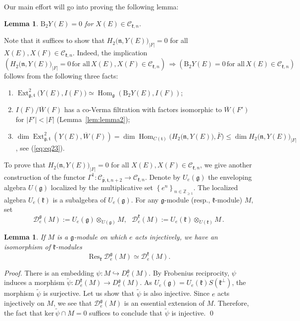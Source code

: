 \documentclass{tglat2e}
\newtheorem{lemma}[theorem]{Lemma}
\theoremstyle{definition}
\theoremstyle{remark}
\renewcommand{\tt}{\mathfrak{t}}
\newcommand{\kk}{\mathfrak{k}}
\newcommand{\nn}{\mathfrak{n}}
\newcommand{\pp}{\mathfrak{p}}
\renewcommand{\gg}{\mathfrak{g}}
\DeclareMathOperator{\Res}{Res}
\newcommand{\Ker}{\mathrm{ker}}
\DeclareMathOperator{\Hom}{Hom}
\DeclareMathOperator{\Ext}{Ext}
\begin{document}
Our main effort will go into proving the following lemma:
	
	\begin{lemma}
		$\mathrm{B}_2Y(E)=0$ for $X(E)\in\mathcal{C}_{\kk,n}$.
		\label{lem:lem18}
	\end{lemma}
	
	Note that it suffices to show that $H_2\big(\nn,Y(E)\big)_{|F|}=0$ for all $X(E),X(F)\in\mathcal{C}_{\kk,n}$.  Indeed, 
the implication 
$$\left(H_2\big(\nn,Y(E)\big)_{|F|}=0\,\text{for all} \,X(E),X(F)\in\mathcal{C}_{\kk,n}\right)\,\Rightarrow \left(\mathrm{B}_2Y(E)=0\,\text{for all}\, X(E)\in\mathcal{C}_{\kk,n}\right)$$ follows from the following three facts:
	\begin{enumerate}
		\item $\Ext^2_{\gg,\tt}\big(Y(E),I(F)\big)\simeq \Hom_\gg\left(\mathrm{B}_2Y(E),I(F)\right)$;
		\item $I(F)/\overline{W}(F)$ has a co-Verma filtration with factors isomorphic to $\overline{W}\left(F'\right)$ for $\left|F'\right| < |F|$ (Lemma~\ref{lem:lemma2});
		\item $\dim\Ext^2_{\gg,\tt}\left(Y(E),\overline{W}(F)\right)=\dim\Hom_{C(\tt)}\Big(H_2\big(\nn,Y(E)\big),\bar{F}\Big)\leq \dim H_2\big(\nn,Y(E)\big)_{|F|}$,
see (\ref{eq:eq23}).
	\end{enumerate}
	
	To prove that $H_2\big(\nn,Y(E)\big)_{|F|}=0$ for all $X(E),X(F)\in\mathcal{C}_{\kk,n}$, we give another construction of 
the functor $\Gamma^1: \mathcal{C}_{\bar{\pp},\tt,n+2}\to\mathcal{C}_{\kk,n} $.  
Denote by $U_e(\gg)$ the enveloping algebra $U(\gg)$ localized by the multiplicative set $\left\{e^n\right\}_{n\in\mathbb{Z}_{\geq 1}}$.   The localized algebra $U_e(\kk)$ is a subalgebra of $U_e(\gg)$. For any $\gg$-module (resp., $\kk$-module) $M$, set
$$\mathcal D^\gg_e(M):=U_e(\gg)\otimes_{U(\gg)}M,\,\,\,\,\mathcal D^\kk_e(M):=U_e(\kk)\otimes_{U(\kk)}M\,.$$

\begin{lemma}\label{lem:localization} If $M$ is a $\gg$-module on which $e$ acts injectively, we have an isomorphism of $\kk$-modules
$${\Res}_\kk\mathcal D^\gg_e(M)\simeq \mathcal D^\kk_e(M).$$
  \end{lemma}
\begin{proof} There is an embedding $\psi:M\hookrightarrow  D^\gg_e(M)$. 
By Frobenius reciprocity, $\psi$ induces a morphism $\tilde\psi:D^\kk_e(M)\to  D^\gg_e(M)$. As $U_e(\gg)=U_e(\kk)S(\kk^\perp)$, the morphism
$\tilde\psi$ is surjective. Let us show that $\tilde\psi$ is also injective. Since $e$ acts injectively on $M$, we see that $\mathcal{D}_e^\gg(M)$ is an essential extension of $M$.  Therefore, the fact that $\Ker\,\tilde\psi\cap M=0$ suffices to conclude that $\tilde\psi$ is injective.
\qed\end{proof}
\end{document}
